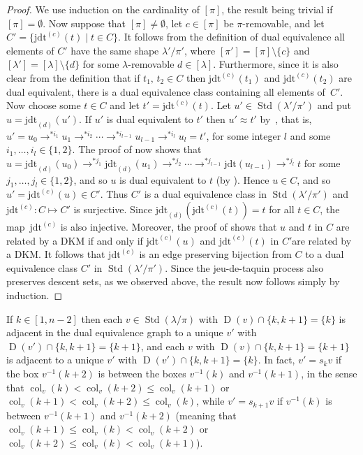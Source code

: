 \documentclass[10pt]{amsart}
\theoremstyle{definition}
\DeclareMathOperator{\col}{col}
\newcommand{\jdt}{\mathrm{jdt}}
\newcommand{\citex}[2]{\cite[#1]{#2}}
\DeclareMathOperator{\STD}{Std}
\DeclareMathOperator{\D}{D}
\begin{document}
\begin{proof}
We use induction on the cardinality of $[\pi]$, the result being trivial if $[\pi]=\emptyset$.
Now suppose that $[\pi]\ne\emptyset$, let $c\in[\pi]$ be $\pi$-removable,
and let $C'=\{\jdt^{(c)}(t)\mid t\in C\}$. It follows from the
definition of dual equivalence all elements of $C'$ have the same shape
$\lambda'/\pi'$, where $[\pi']=[\pi]\setminus\{c\}$ and
$[\lambda']=[\lambda]\setminus\{d\}$ for some $\lambda$-removable $d\in[\lambda]$.
Furthermore, since it is also clear from the definition that if $t_1,\,t_2\in C$
then $\jdt^{(c)}(t_1)$ and $\jdt^{(c)}(t_2)$ are dual equivalent, there is
a dual equivalence class containing all elements of~$C'$.
Now choose some $t\in C$ and let $t'=\jdt^{(c)}(t)$.
Let $u'\in\STD(\lambda'/\pi')$ and put $u=\jdt_{(d)}(u')$.
If $u'$ is dual equivalent to $t'$ then $u'\approx t'$
by~\citex{Theorem~3.8.8}{sag:sym}, that is,
$u'=u_0\to^{*i_{1}}u_1\to^{*i_{2}}\cdots \to^{*i_{l-1}} u_{l-1}\to^{*i_{l}}u_l=t'$, for
some integer $l$ and some $i_1,\ldots,i_l\in\{1,2\}$.
The proof of \citex{Theorem~3.8.8}{sag:sym} now shows that
$u=\jdt_{(d)}(u_0)\to^{*j_{1}}\jdt_{(d)}(u_1)\to^{*j_{2}}\cdots \to^{*j_{l-1}}\jdt(u_{l-1})\to^{*j_l} t$
for some $j_1,\ldots,j_l\in\{1,2\}$, and so
$u$ is dual equivalent to $t$ (by \citex{Theorem~3.8.8}{sag:sym}).
Hence $u\in C$, and so $u'=\jdt^{(c)}(u)\in C'$. Thus $C'$ is a dual equivalence
class in $\STD(\lambda'/\pi')$ and $\jdt^{(c)}\colon C\mapsto C'$ is surjective.
Since $\jdt_{(d)}(\jdt^{(c)}(t))=t$ for all $t\in C$,
the map~$\jdt^{(c)}$ is also injective. Moreover, the proof
of \text{\citex{Theorem~3.8.8}{sag:sym}} shows that $u$ and $t$ in $C$ are
related by a DKM if and only if $\jdt^{(c)}(u)$ and
$\jdt^{(c)}(t)$ in $C'$are related by a DKM.
It follows that $\jdt^{(c)}$ is an edge preserving bijection from $C$
to a dual equivalence class $C'$ in $\STD(\lambda'/\pi')$.
Since the jeu-de-taquin process also preserves descent sets, as we observed
above, the result now follows simply by induction.
\end{proof}

If $k\in[1,n-2]$ then each
$v\in\STD(\lambda/\pi)$ with $\D(v)\cap\{k,k+1\}=\{k\}$ is adjacent
in the dual equivalence graph to a unique $v'$ with
$\D(v')\cap\{k,k+1\}=\{k+1\}$, and each $v$ with
$\D(v)\cap\{k,k+1\}=\{k+1\}$
is adjacent to a unique $v'$ with $\D(v')\cap\{k,k+1\}=\{k\}$.
In fact, $v'=s_kv$ if
the box $v^{-1}(k+2)$ is between the boxes $v^{-1}(k)$ and $v^{-1}(k+1)$, in the sense that
$\col_v(k)<\col_v(k+2)\leq\col_v(k+1)$ or
$\col_v(k+1)<\col_v(k+2)\leq\col_v(k)$,
while $v'=s_{k+1}v$ if
$v^{-1}(k)$ is between $v^{-1}(k+1)$ and $v^{-1}(k+2)$ (meaning that
$\col_v(k+1)\leq\col_v(k)<\col_v(k+2)$ or
$\col_v(k+2)\leq\col_v(k)<\col_v(k+1)$).
\end{document}
